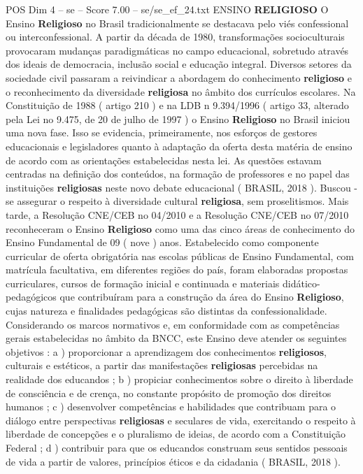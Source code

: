 \begin{textsample}{POS Dim 4 – se – Score 7.00 – se/se\_ef\_24.txt}  \label{ex:f4_pos_147}
ENSINO \textbf{RELIGIOSO} O Ensino \textbf{Religioso} no Brasil tradicionalmente se destacava pelo viés confessional ou interconfessional.
A partir da década de 1980, transformações socioculturais provocaram mudanças paradigmáticas no campo educacional, sobretudo através dos ideais de democracia, inclusão social e educação integral.
Diversos setores da sociedade civil passaram a reivindicar a abordagem do conhecimento \textbf{religioso} e o reconhecimento da diversidade \textbf{religiosa} no âmbito dos currículos escolares.
Na Constituição de 1988 ( artigo 210 ) e na LDB n 9.394/1996 ( artigo 33, alterado pela Lei no 9.475, de 20 de julho de 1997 ) o Ensino \textbf{Religioso} no Brasil iniciou uma nova fase.
Isso se evidencia, primeiramente, nos esforços de gestores educacionais e legisladores quanto à adaptação da oferta desta matéria de ensino de acordo com as orientações estabelecidas nesta lei.
As questões estavam centradas na definição dos conteúdos, na formação de professores e no papel das instituições \textbf{religiosas} neste novo debate educacional ( BRASIL, 2018 ).
Buscou -se assegurar o respeito à diversidade cultural \textbf{religiosa}, sem proselitismos.
Mais tarde, a Resolução CNE/CEB no 04/2010 e a Resolução CNE/CEB no 07/2010 reconheceram o Ensino \textbf{Religioso} como uma das cinco áreas de conhecimento do Ensino Fundamental de 09 ( nove ) anos.
Estabelecido como componente curricular de oferta obrigatória nas escolas públicas de Ensino Fundamental, com matrícula facultativa, em diferentes regiões do país, foram elaboradas propostas curriculares, cursos de formação inicial e continuada e materiais didático-pedagógicos que contribuíram para a construção da área do Ensino \textbf{Religioso}, cujas natureza e finalidades pedagógicas são distintas da confessionalidade.
Considerando os marcos normativos e, em conformidade com as competências gerais estabelecidas no âmbito da BNCC, este Ensino deve atender os seguintes objetivos : a ) proporcionar a aprendizagem dos conhecimentos \textbf{religiosos}, culturais e estéticos, a partir das manifestações \textbf{religiosas} percebidas na realidade dos educandos ; b ) propiciar conhecimentos sobre o direito à liberdade de consciência e de crença, no constante propósito de promoção dos direitos humanos ; c ) desenvolver competências e habilidades que contribuam para o diálogo entre perspectivas \textbf{religiosas} e seculares de vida, exercitando o respeito à liberdade de concepções e o pluralismo de ideias, de acordo com a Constituição Federal ; d ) contribuir para que os educandos construam seus sentidos pessoais de vida a partir de valores, princípios éticos e da cidadania ( BRASIL, 2018 ).

\end{textsample}
